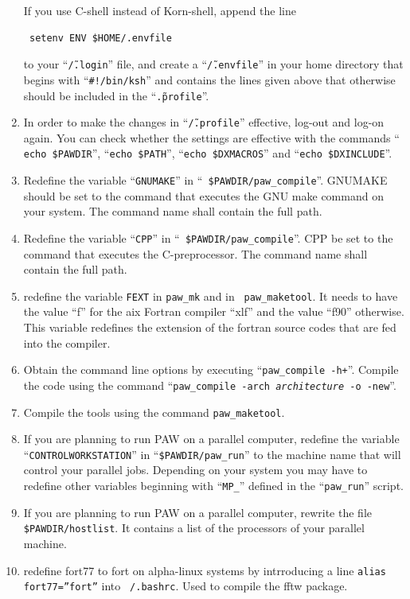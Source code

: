 \documentclass[final,12pt]{article}
\begin{document}
\begin{enumerate}
 If you use C-shell instead of Korn-shell, append the line
\begin{verbatim}
 setenv ENV $HOME/.envfile
\end{verbatim}
 to your ``{\tt\~/.login}'' file, and create a ``{\tt\~/.envfile}'' in
 your home directory that begins with ``{\tt \#!/bin/ksh}'' and
 contains the lines given above that otherwise should be included in
 the ``{\tt\~.profile}''.
\item In order to make the changes in ``{\tt \~/.profile}'' effective,
  log-out and log-on again.  You can check whether the settings are
  effective with the commands ``{\tt
    echo \$PAWDIR}'', ``{\tt echo \$PATH}'', ``{\tt echo \$DXMACROS}''
  and ``{\tt echo \$DXINCLUDE}''.
\item Redefine the variable ``{\tt GNUMAKE}'' in ``{\tt
    \$PAWDIR/paw\_compile}''. GNUMAKE should be set to the command that
  executes the GNU make command \cite{FreeSoftwareFoundation} on your
  system. The command name shall contain the full path.
\item Redefine the variable ``{\tt CPP}'' in ``{\tt
    \$PAWDIR/paw\_compile}''. CPP be set to the command that
  executes the C-preprocessor. The command name shall contain the full path.
\item redefine the variable {\tt FEXT} in {\tt paw\_mk} and in {\tt
    paw\_maketool}. It needs to have the value ``f'' for the aix
  Fortran compiler ``xlf'' and the value ``f90'' otherwise. This
  variable redefines the extension of the fortran source codes that
  are fed into the compiler.
\item Obtain the command line options by
  executing ``{\tt paw\_compile -h+}''. 
  Compile the code using the command ``{\tt paw\_compile -arch
    {\it architecture} -o -new}''.  
\item Compile the tools using the command {\tt paw\_maketool}.
\item 
\begin{sloppypar} 
If you are planning to run PAW on a parallel computer, redefine the
  variable ``{\tt CONTROLWORKSTATION}'' in ``{\tt \$PAWDIR/paw\_run}''
  to the machine name that will control your parallel jobs.  Depending
  on your system you may have to redefine other variables beginning
  with ``{\tt MP\_}'' defined in the ``{\tt paw\_run}'' script. 
\end{sloppypar}
\item 
\begin{sloppypar} 
  If you are planning to run PAW on a parallel computer, rewrite the
  file {\tt \$PAWDIR/hostlist}. It contains a list of the processors of
  your parallel machine. 
\end{sloppypar} 
\item redefine fort77 to fort on alpha-linux systems by intrroducing a
line {\tt alias fort77=''fort''} into {\tt ~/.bashrc}. Used to compile the
fftw package.
\end{enumerate}
\end{document}
